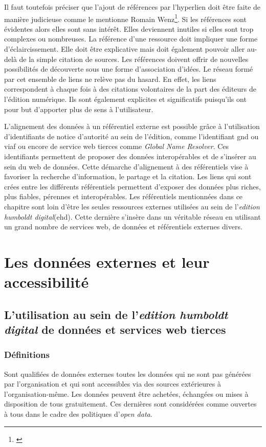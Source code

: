 \documentclass[a4paper, 12pt, twoside]{book}
\begin{document}
Il faut toutefois préciser que l'ajout de références par l'hyperlien doit être faite de manière judicieuse comme le mentionne Romain Wenz\footnote{\cite{wenz_hypertextualisation_2012}}. Si les références sont évidentes alors elles sont sans intérêt. Elles deviennent inutiles si elles sont trop complexes ou nombreuses. La référence d'une ressource doit impliquer une forme d'éclaircissement. Elle doit être explicative mais doit également pouvoir aller au-delà de la simple citation de sources. Les références doivent offrir de nouvelles possibilités de découverte sous une forme d'association d'idées.
Le réseau formé par cet ensemble de liens ne relève pas du hasard. En effet, les liens correspondent à chaque fois à des citations volontaires de la part des éditeurs de l'édition numérique. Ils sont également explicites et significatifs puisqu'ils ont pour but d'apporter plus de sens à l'utilisateur. 

L'alignement des données à un référentiel externe est possible grâce à l'utilisation d'identifiants de notice d'autorité au sein de l'édition, comme l'identifiant \gls{gnd} ou \gls{viaf} ou encore de service web tierces comme \textit{Global Name Resolver}. Ces identifiants permettent de proposer des données interopérables et de s'insérer au sein du web de données. Cette démarche d'alignement à des référentiels vise à favoriser la recherche d'information, le partage et la citation. Les liens qui sont crées entre les différents référentiels permettent d'exposer des données plus riches, plus fiables, pérennes et interopérables. Les référentiels mentionnées dans ce chapitre sont loin d'être les seules ressources externes utilisées au sein de l'\textit{edition humboldt digital}(ehd). Cette dernière s'insère dans un véritable réseau en utilisant un grand nombre de services web, de données et référentiels externes divers.


\chapter{Les données externes et leur accessibilité}
\section{L'utilisation au sein de l'\textit{edition humboldt digital} de données et services web tierces }
\subsection{Définitions}
Sont qualifiées de données externes toutes les données qui ne sont pas générées par l'organisation et qui sont accessibles via des sources extérieures à l'organisation-même. Les données peuvent être achetées, échangées ou mises à disposition de tous gratuitement. Ces dernières sont considérées comme ouvertes à tous dans le cadre des politiques d'\textit{open data}. 
\end{document}
